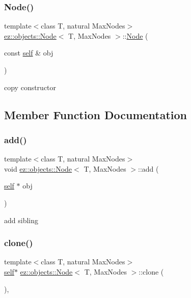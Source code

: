 \subsubsection{\texorpdfstring{Node()}{Node()}\hspace{0.1cm}{\footnotesize\ttfamily [2/2]}}
{\footnotesize\ttfamily template$<$class T, natural Max\+Nodes$>$ \\
\hyperlink{classez_1_1objects_1_1Node}{ez\+::objects\+::\+Node}$<$ T, Max\+Nodes $>$\+::\hyperlink{classez_1_1objects_1_1Node}{Node} (\begin{DoxyParamCaption}\item[{const \hyperlink{classez_1_1objects_1_1Node}{self} \&}]{obj }\end{DoxyParamCaption})\hspace{0.3cm}{\ttfamily [inline]}}

copy constructor 

\subsection{Member Function Documentation}
\mbox{\label{classez_1_1objects_1_1Node_ac47d8b9b552dea606aeeceb4d00fb2e2}} 
\subsubsection{\texorpdfstring{add()}{add()}}
{\footnotesize\ttfamily template$<$class T, natural Max\+Nodes$>$ \\
void \hyperlink{classez_1_1objects_1_1Node}{ez\+::objects\+::\+Node}$<$ T, Max\+Nodes $>$\+::add (\begin{DoxyParamCaption}\item[{\hyperlink{classez_1_1objects_1_1Node}{self} $\ast$}]{obj }\end{DoxyParamCaption})\hspace{0.3cm}{\ttfamily [inline]}}

add sibling \mbox{\label{classez_1_1objects_1_1Node_ae2876fa89991bf6593f54e015f22a156}} 
\subsubsection{\texorpdfstring{clone()}{clone()}}
{\footnotesize\ttfamily template$<$class T, natural Max\+Nodes$>$ \\
\hyperlink{classez_1_1objects_1_1Node}{self}$\ast$ \hyperlink{classez_1_1objects_1_1Node}{ez\+::objects\+::\+Node}$<$ T, Max\+Nodes $>$\+::clone (\begin{DoxyParamCaption}{ }\end{DoxyParamCaption})\hspace{0.3cm}{\ttfamily [inline]}, {\ttfamily [virtual]}}

